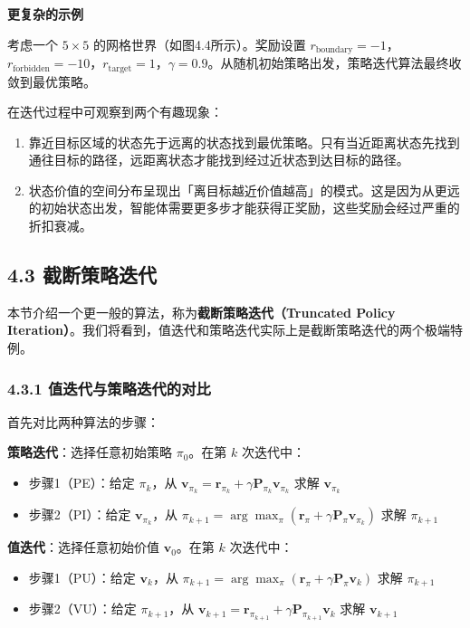 \documentclass[UTF8]{article}
\begin{document}
\textbf{更复杂的示例}

考虑一个 $5 \times 5$ 的网格世界（如图4.4所示）。奖励设置 $r_{\text{boundary}} = -1$，$r_{\text{forbidden}} = -10$，$r_{\text{target}} = 1$，$\gamma = 0.9$。从随机初始策略出发，策略迭代算法最终收敛到最优策略。

在迭代过程中可观察到两个有趣现象：
\begin{enumerate}
    \item 靠近目标区域的状态先于远离的状态找到最优策略。只有当近距离状态先找到通往目标的路径，远距离状态才能找到经过近状态到达目标的路径。
    \item 状态价值的空间分布呈现出「离目标越近价值越高」的模式。这是因为从更远的初始状态出发，智能体需要更多步才能获得正奖励，这些奖励会经过严重的折扣衰减。
\end{enumerate}

\subsection*{4.3 截断策略迭代}

本节介绍一个更一般的算法，称为\textbf{截断策略迭代（Truncated Policy Iteration）}。我们将看到，值迭代和策略迭代实际上是截断策略迭代的两个极端特例。

\subsubsection*{4.3.1 值迭代与策略迭代的对比}

首先对比两种算法的步骤：

\textbf{策略迭代}：选择任意初始策略 $\pi_0$。在第 $k$ 次迭代中：
\begin{itemize}
    \item 步骤1（PE）：给定 $\pi_k$，从 $\boldsymbol{v}_{\pi_k} = \boldsymbol{r}_{\pi_k} + \gamma \boldsymbol{P}_{\pi_k} \boldsymbol{v}_{\pi_k}$ 求解 $\boldsymbol{v}_{\pi_k}$
    \item 步骤2（PI）：给定 $\boldsymbol{v}_{\pi_k}$，从 $\pi_{k+1} = \arg\max_\pi (\boldsymbol{r}_\pi + \gamma \boldsymbol{P}_\pi \boldsymbol{v}_{\pi_k})$ 求解 $\pi_{k+1}$
\end{itemize}

\textbf{值迭代}：选择任意初始价值 $\boldsymbol{v}_0$。在第 $k$ 次迭代中：
\begin{itemize}
    \item 步骤1（PU）：给定 $\boldsymbol{v}_k$，从 $\pi_{k+1} = \arg\max_\pi (\boldsymbol{r}_\pi + \gamma \boldsymbol{P}_\pi \boldsymbol{v}_k)$ 求解 $\pi_{k+1}$
    \item 步骤2（VU）：给定 $\pi_{k+1}$，从 $\boldsymbol{v}_{k+1} = \boldsymbol{r}_{\pi_{k+1}} + \gamma \boldsymbol{P}_{\pi_{k+1}} \boldsymbol{v}_k$ 求解 $\boldsymbol{v}_{k+1}$
\end{itemize}
\end{document}
